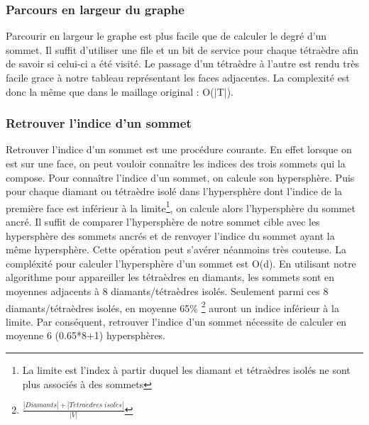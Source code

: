 \subsubsection{Parcours en largeur du graphe}
\noindent
Parcourir en largeur le graphe est plus facile que de calculer le degré d'un sommet. Il suffit d'utiliser une file et un bit de service pour chaque tétraèdre afin de savoir si celui-ci a été visité. Le passage d'un tétraèdre à l'autre est rendu très facile grace à notre tableau représentant les faces adjacentes. La complexité est donc la même que dans le maillage original : O($|$T$|$).
\subsubsection{Retrouver l'indice d'un sommet}
\label{Retrouver l'indice d'un sommet}
\noindent
Retrouver l'indice d'un sommet est une procédure courante. En effet lorsque on est sur une face, on peut vouloir connaître les indices des trois sommets qui la compose. Pour connaître l'indice d'un sommet, on calcule son hypersphère. Puis pour chaque diamant ou tétraèdre isolé dans l'hypersphère dont l'indice de la première face est inférieur à la limite\footnote{La limite est l'index à partir duquel les diamant et tétraèdres isolés ne sont plus associés à des sommets}, on calcule alors l'hypersphère du sommet ancré. Il suffit de comparer l'hypersphère de notre sommet cible avec les hypersphère des sommets ancrés et de renvoyer l'indice du sommet ayant la même hypersphère. Cette opération peut s'avérer néanmoins très couteuse. La compléxité pour calculer l'hypersphère d'un sommet est O(d). En utilisant notre algorithme pour appareiller les tétraèdres en diamants, les sommets sont en moyennes adjacents à 8 diamants/tétraèdres isolés. Seulement parmi ces 8 diamants/tétraèdres isolés, en moyenne 65\% \footnote{$\frac{|Diamants|+|T\acute{e}tra\grave{e}dres\; isol\acute{e}s|}{|V|}$} auront un indice inférieur à la limite. Par conséquent, retrouver l'indice d'un sommet nécessite de calculer en moyenne 6 (0.65*8+1) hypersphères.

% 
% 

